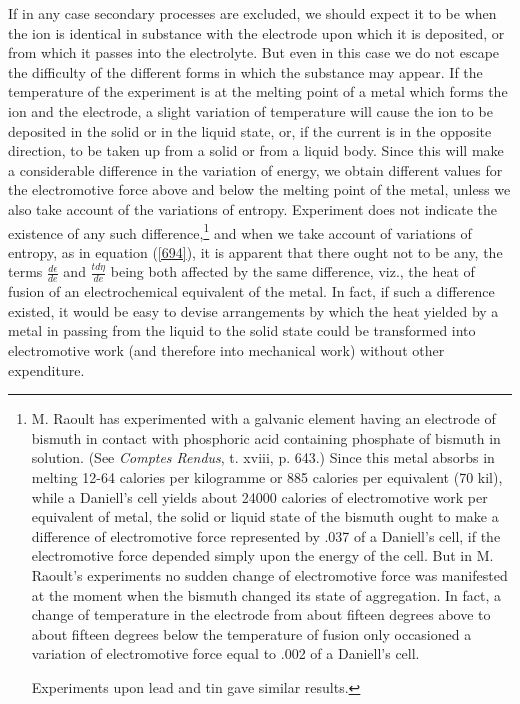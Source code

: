 \documentclass[12pt]{article}
\begin{document}
If in any case secondary processes are excluded, we should expect it to be when the ion is identical in substance with the electrode upon which it is deposited, or from which it passes into the electrolyte. But even in this case we do not escape the difficulty of the different forms in which the substance may appear. If the temperature of the experiment is at the melting point of a metal which forms the ion and the electrode, a slight variation of temperature will cause the ion to be deposited in the solid or in the liquid state, or, if the current is in the opposite direction, to be taken up from a solid or from a liquid body. Since this will make a considerable difference in the variation of energy, we obtain different values for the electromotive force above and below the melting point of the metal, unless we also take account of the variations of entropy. Experiment does not indicate the existence of any such difference,\footnote{M. Raoult has experimented with a galvanic element having an electrode of bismuth in contact with phosphoric acid containing phosphate of bismuth in solution. (See \textit{Comptes Rendus}, t. xviii, p. 643.) Since this metal absorbs in melting 12-64 calories per kilogramme or 885 calories per equivalent (70 kil), while a Daniell's cell yields about 24000 calories of electromotive work per equivalent of metal, the solid or liquid state of the bismuth ought to make a difference of electromotive force represented by .037 of a Daniell's cell, if the electromotive force depended simply upon the energy of the cell. But in M. Raoult's experiments no sudden change of electromotive force was manifested at the moment when the bismuth changed its state of aggregation. In fact, a change of temperature in the electrode from about fifteen degrees above to about fifteen degrees below the temperature of fusion only occasioned a variation of electromotive force equal to .002 of a Daniell's cell. \par
Experiments upon lead and tin gave similar results.} and when we take account of variations of entropy, as in equation (\ref{694}), it is apparent that there ought not to be any, the terms $\frac{d\epsilon}{de}$ and $\frac{td\eta}{de}$ being both affected by the same difference, viz., the heat of fusion of an electrochemical equivalent of the metal. In fact, if such a difference existed, it would be easy to devise arrangements by which the heat yielded by a metal in passing from the liquid to the solid state could be transformed into electromotive work (and therefore into mechanical work) without other expenditure.
\end{document}

